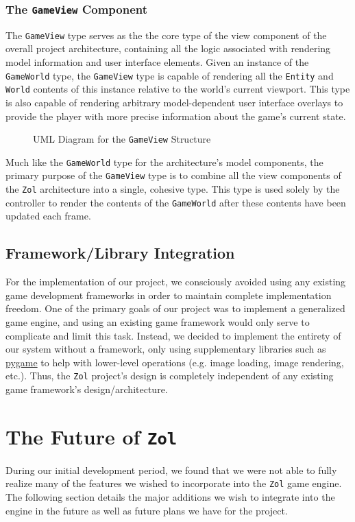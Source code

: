 \documentclass{article}
\newcommand{\classname}[1] {\texttt{#1}}
\newcommand{\projectname}[0] {\texttt{Zol} }
\newcommand{\insertdiagram}[2]
{
	\begin{figure}[H]
		\centering
		\fbox{\texttt{[image: figures/\#1]}}
		\caption{UML Diagram for the \classname{#1} Structure}
	\end{figure}
}
\begin{document}
			\subsubsection[\classname{GameView}]{The \classname{GameView} Component}
			The \classname{GameView} type serves as the the core type of the 
			view component of the overall project architecture, containing all
			the logic associated with rendering model information and user
			interface elements.  Given an instance of the \classname{GameWorld}
			type, the \classname{GameView} type is capable of rendering all
			the \classname{Entity} and \classname{World} contents of this
			instance relative to the world's current viewport.  This type
			is also capable of rendering arbitrary model-dependent user 
			interface overlays to provide the player with more precise
			information about the game's current state.

			\insertdiagram{GameView}{2.0in}

			Much like the \classname{GameWorld} type for the architecture's
			model components, the primary purpose of the \classname{GameView} 
			type is to combine all the view components of the \projectname architecture 
			into a single, cohesive type.  This type is used solely by the controller
			to render the contents of the \classname{GameWorld} after these
			contents have been updated each frame.

		\subsection{Framework/Library Integration}
		For the implementation of our project, we consciously avoided using any
		existing game development frameworks in order to maintain complete
		implementation freedom.  One of the primary goals of our project was
		to implement a generalized game engine, and using an existing game
		framework would only serve to complicate and limit this task.  Instead, 
		we decided to implement the entirety of our system without a framework, 
		only using supplementary libraries such as 
		\href{http://www.pygame.org/news.html}{pygame} to help with lower-level 
		operations (e.g. image loading, image rendering, etc.).  Thus, the
		\projectname project's design is completely independent of any existing 
		game framework's design/architecture.


	\section[Future Plans]{The Future of \projectname}
	During our initial development period, we found that we were not able to
	fully realize many of the features we wished to incorporate into the
	\projectname game engine.  The following section details the major additions
	we wish to integrate into the engine in the future as well as future plans 
	we have for the project.
\end{document}
